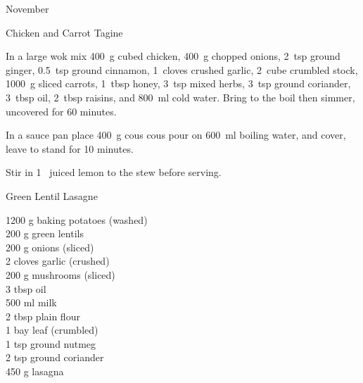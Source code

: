 \begin{menu}{November}
\begin{recipe}{2}{Chicken and Carrot Tagine}
    \begin{instructions}
    \item 
        In a large wok mix
        400~g cubed chicken,
        400~g chopped onions,
        2~tsp  ground ginger,
        0.5~tsp  ground cinnamon,
        1~cloves crushed garlic,
        2~cube crumbled stock,
        1000~g sliced carrots,
        1~tbsp  honey,
        3~tsp  mixed herbs,
        3~tsp  ground coriander,
        3~tbsp  oil,
        2~tbsp  raisins,
        and
        800~ml  cold water.
        Bring to the boil
        then simmer, uncovered for 60 minutes.
      \item 
    In a
    sauce pan 
    place
    400~g  cous cous
    pour on
    600~ml  boiling water,
    and cover, leave to stand for 10 minutes.
  \item 
        Stir in
        1~ juiced lemon
        to the stew
        before serving.
      
    \end{instructions}
    \end{recipe}%
  
    \begin{recipe}{2}{Green Lentil Lasagne}%
		\begin{ingredients}
		1200 g baking potatoes (washed) \\
	200 g green lentils  \\
	200 g onions (sliced) \\
	2 cloves garlic (crushed) \\
	200 g mushrooms (sliced) \\
	3 tbsp oil  \\
	500 ml milk  \\
	2 tbsp plain flour  \\
	1  bay leaf (crumbled) \\
	1 tsp ground nutmeg  \\
	2 tsp ground coriander  \\
	450 g lasagna  \\
	
		\end{ingredients}
	
	

\end{recipe}
\end{menu}
